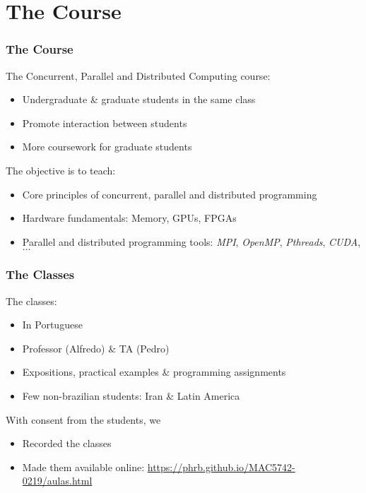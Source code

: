 \documentclass[10pt, compress, aspectratio=169]{beamer}
\begin{document}
\section{The Course}

\begin{frame}
    \frametitle{The Course}
    The Concurrent, Parallel and Distributed Computing course:

    \begin{itemize}
        \item \alert{Undergraduate} \& \alert{graduate} students in the \alert{same class}
        \item Promote \alert{interaction} between students
        \item More coursework for graduate students
    \end{itemize}

    \pause

    The \alert{objective} is to teach:

    \begin{itemize}
        \item \alert{Core principles} of concurrent, parallel and distributed programming
            \pause
        \item \alert{Hardware fundamentals}: Memory, GPUs, FPGAs
            \pause
        \item Parallel and distributed \alert{programming tools}: \textit{MPI}, \textit{OpenMP}, \textit{Pthreads},
            \textit{CUDA}, $\dots$
    \end{itemize}
\end{frame}

\begin{frame}
    \frametitle{The Classes}
    The classes:

    \begin{itemize}
        \item In \alert{Portuguese}
        \item Professor (Alfredo) \& TA (\alert{Pedro})
        \item Expositions, practical examples \& \alert{programming assignments}
        \item Few non-brazilian students: Iran \& Latin America
    \end{itemize}

    \pause

    With consent from the students, we

    \begin{itemize}
        \item Recorded the classes
        \item Made them available online:
            \url{https://phrb.github.io/MAC5742-0219/aulas.html}
    \end{itemize}
\end{frame}
\end{document}
